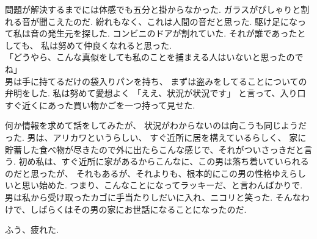 問題が解決するまでには体感でも五分と掛からなかった.
ガラスがぴしゃりと割れる音が聞こえたのだ.
紛れもなく、これは人間の音だと思った.
駆け足になって私は音の発生元を探した.
コンビニのドアが割れていた.
それが誰であったとしても、
私は努めて仲良くなれると思った.\\
「どうやら、こんな真似をしても私のことを捕まえる人はいないと思ったのでね」\\
男は手に持てるだけの袋入りパンを持ち、
まずは盗みをしてることについての弁明をした.
私は努めて愛想よく
「ええ、状況が状況です」
と言って、入り口すぐ近くにあった買い物かごを一つ持って見せた.

何か情報を求めて話をしてみたが、
状況がわからないのは向こうも同じようだった.
男は、アリカワというらしい、
すぐ近所に居を構えているらしく、
家に貯蓄した食べ物が尽きたので外に出たらこんな感じで、それがついさっきだと言う.
初め私は、すぐ近所に家があるからこんなに、この男は落ち着いていられるのだと思ったが、
それもあるが、それよりも、根本的にこの男の性格ゆえらしいと思い始めた.
つまり、こんなことになってラッキーだ、と言わんばかりで.
男は私から受け取ったカゴに手当たりしだいに入れ、ニコリと笑った.
そんなわけで、しばらくはその男の家にお世話になることになったのだ.

ふう、疲れた.

